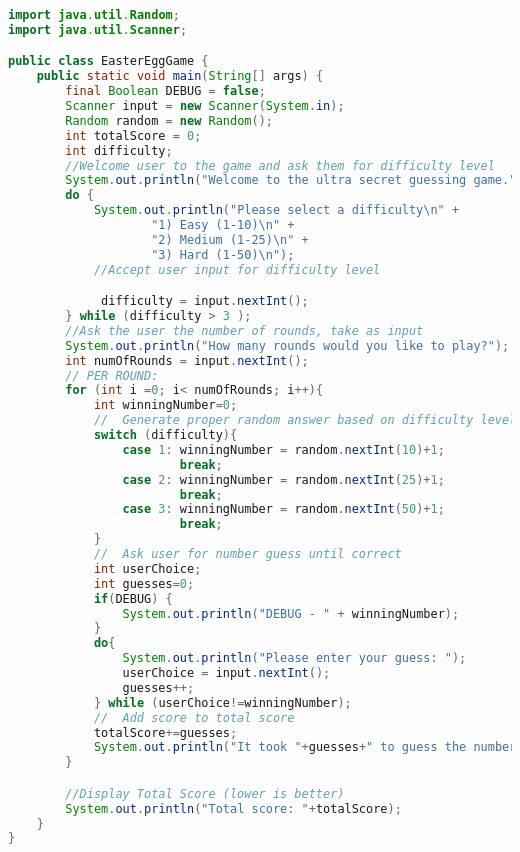 \documentclass{article}
\begin{document}
\begin{lstlisting}[language=java]
import java.util.Random;
import java.util.Scanner;

public class EasterEggGame {
    public static void main(String[] args) {
        final Boolean DEBUG = false;
        Scanner input = new Scanner(System.in);
        Random random = new Random();
        int totalScore = 0;
        int difficulty;
        //Welcome user to the game and ask them for difficulty level
        System.out.println("Welcome to the ultra secret guessing game.");
        do {
            System.out.println("Please select a difficulty\n" +
                    "1) Easy (1-10)\n" +
                    "2) Medium (1-25)\n" +
                    "3) Hard (1-50)\n");
            //Accept user input for difficulty level

             difficulty = input.nextInt();
        } while (difficulty > 3 );
        //Ask the user the number of rounds, take as input
        System.out.println("How many rounds would you like to play?");
        int numOfRounds = input.nextInt();
        // PER ROUND:
        for (int i =0; i< numOfRounds; i++){
            int winningNumber=0;
            //  Generate proper random answer based on difficulty level
            switch (difficulty){
                case 1: winningNumber = random.nextInt(10)+1;
                        break;
                case 2: winningNumber = random.nextInt(25)+1;
                        break;
                case 3: winningNumber = random.nextInt(50)+1;
                        break;
            }
            //  Ask user for number guess until correct
            int userChoice;
            int guesses=0;
            if(DEBUG) {
                System.out.println("DEBUG - " + winningNumber);
            }
            do{
                System.out.println("Please enter your guess: ");
                userChoice = input.nextInt();
                guesses++;
            } while (userChoice!=winningNumber);
            //  Add score to total score
            totalScore+=guesses;
            System.out.println("It took "+guesses+" to guess the number");
        }

        //Display Total Score (lower is better)
        System.out.println("Total score: "+totalScore);
    }
}
\end{lstlisting}
\end{document}
